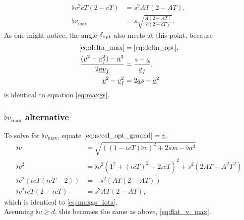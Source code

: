 \begin{align*}
\flat{v}^2 cT(2 - cT) &= s^2 AT(2 - AT),\\
\flat{v}_{\max} &= s \sqrt{\frac{A(2 - AT)}{c(2 - cT)}}.
\end{align*}
As one might notice, the angle $\delta_{\operatorname{opt}}$ also meets at this point, because
\begin{align*}
\eqref{eq:delta_max} &= \eqref{eq:delta_opt},\\
\frac{(\flat{v}^2 - \flat{v}_f^2) - \flat{a}^2}{2 \flat{a} \flat{v}_f} &= \frac{s - \flat{a}}{\flat{v}_f},\\
\flat{v}^2 - \flat{v}_f^2 &= 2 \flat{a} s - \flat{a}^2
\end{align*}
is identical to equation \eqref{eq:maxgs}.


\subsubsection{\texorpdfstring{$\flat{v}_{\max}$ alternative}{flat v\_max alternative}}
\label{app:derive_flat_v_max_alternative}
To solve for $\flat{v}_{\max}$, equate $\eqref{eq:accel_opt_ground} = \flat{v}$.
\begin{align*}
\flat{v} &= \sqrt{\left((1 - \iota cT)\flat{v} \right)^2 + 2s\flat{a} - \flat{a}^2}\\
\flat{v}^2 &= \flat{v}^2\left(1^2 + (\iota cT)^2 - 2\iota cT \right)^2 + s^2(2AT - A^2T^2)\\
\flat{v}^2(\iota cT(\iota cT - 2)) &= -s^2(AT(2 - AT))\\
\flat{v}^2\iota cT(2 - \iota cT) &= s^2AT(2 - AT),
\end{align*}
which is identical to \eqref{eq:maxgs_iota}.\\
Assuming $\flat{v} \ge d$, this becomes the same as above, \eqref{eq:flat_v_max}.


